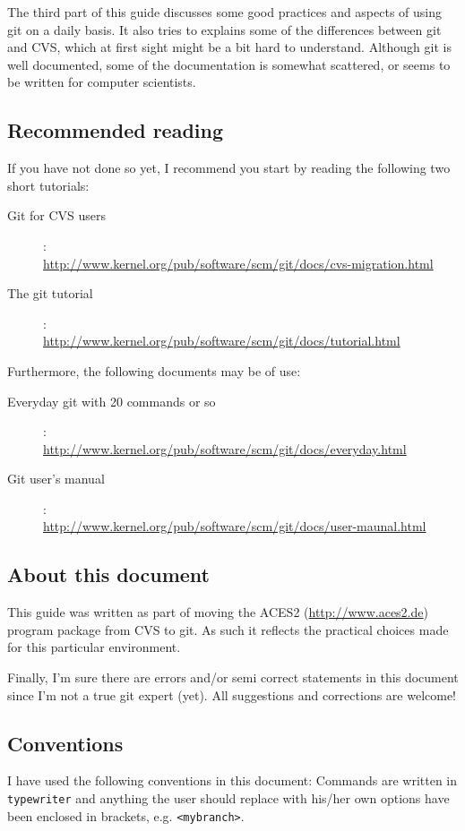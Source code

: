 \documentclass[a4paper,10pt]{article}
\begin{document}
The third part of this guide discusses some good practices and aspects of 
using git on a daily basis.
It also tries to explains some of the differences between git and
CVS, which at first sight might be a bit hard to understand. Although git is
well documented, some of the documentation is somewhat scattered, or seems to
be written for computer scientists.

\subsection{Recommended reading}
If you have not done so yet, I
recommend you start by reading the following two short tutorials:
\begin{description}
\item[Git for CVS users]:\\
\url{http://www.kernel.org/pub/software/scm/git/docs/cvs-migration.html}
\item[The git tutorial]:\\
\url{http://www.kernel.org/pub/software/scm/git/docs/tutorial.html}
\end{description}
Furthermore, the following documents may be of use:
\begin{description}
\item[Everyday git with 20 commands or so]:\\
\url{http://www.kernel.org/pub/software/scm/git/docs/everyday.html}
\item[Git user's manual]:\\
\url{http://www.kernel.org/pub/software/scm/git/docs/user-maunal.html}
\end{description}

\subsection{About this document}
This guide was written as part of moving the ACES2 (\url{http://www.aces2.de})
program package from CVS to git. As such it reflects the 
practical choices made for this particular environment. 

Finally, I'm sure there are errors and/or semi correct statements in this
document since I'm not a true git expert (yet). All suggestions and
corrections are welcome!

\subsection{Conventions}
I have used the following conventions in this document: Commands are written 
in {\tt typewriter} and anything the user should replace with his/her own 
options have been enclosed in brackets, e.g. {\tt <mybranch>}.  
\end{document}
